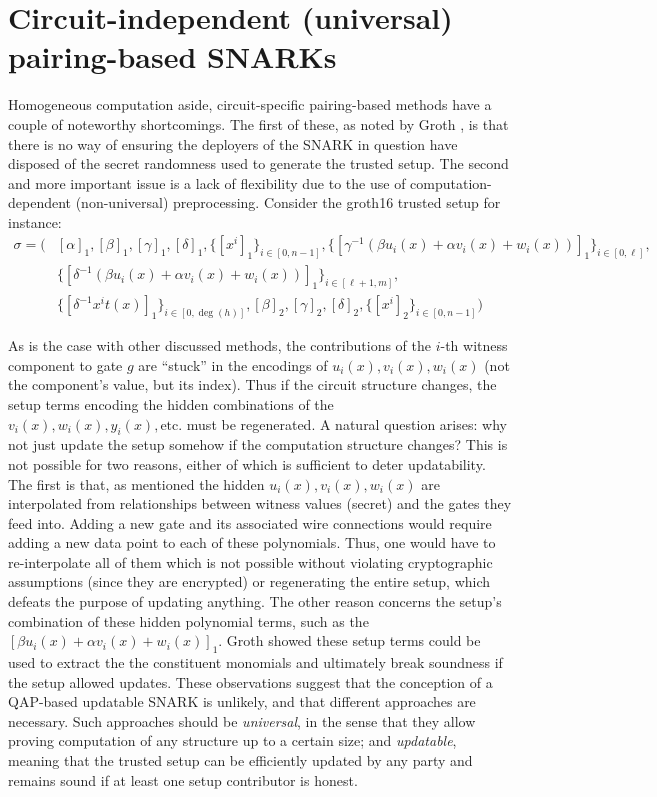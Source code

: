 \section{Circuit-independent (universal) pairing-based SNARKs}
\noindent Homogeneous computation aside, circuit-specific pairing-based methods have a couple of noteworthy shortcomings. The first of these, as noted by Groth \cite{grothupdatable}, is that there is no way of ensuring the deployers of the SNARK in question have disposed of the secret randomness used to generate the trusted setup. The second and more important issue is a lack of flexibility due to the use of computation-dependent (non-universal) preprocessing. Consider the groth16 trusted setup for instance: 
\begin{align}
\sigma = \Big( 
    &[\alpha]_1, [\beta]_1, [\gamma]_1, [\delta]_1, \{[x^i]_1\}_{i \in [0, n-1]}, \{[\gamma^{-1}(\beta u_i(x) + \alpha v_i(x) + w_i(x))]_1\}_{i \in [0, \ell]}, \\
    &\{[\delta^{-1}(\beta u_i(x) + \alpha v_i(x) + w_i(x))]_1\}_{i \in [\ell+1, m]}, \\
    &\{[\delta^{-1} x^i t(x)]_1\}_{i \in [0, \deg(h)]}, [\beta]_2, [\gamma]_2, [\delta]_2, \{[x^i]_2\}_{i \in [0, n-1]}
\Big)
\end{align}

\noindent As is the case with other discussed methods, the contributions of the $i$-th witness component to gate $g$ are ``stuck'' in the encodings of $u_i(x), v_i(x), w_i(x)$ (not the component's value, but its index). Thus if the circuit structure changes, the setup terms encoding the hidden combinations of the $v_i(x), w_i(x), y_i(x), \text{etc.}$ must be regenerated. A natural question arises: why not just update the setup somehow if the computation structure changes? This is not possible for two reasons, either of which is sufficient to deter updatability. The first is that, as mentioned the hidden $u_i(x), v_i(x), w_i(x)$ are interpolated from relationships between witness values (secret) and the gates they feed into. Adding a new gate and its associated wire connections would require adding a new data point to each of these polynomials. Thus, one would have to re-interpolate all of them which is not possible without violating cryptographic assumptions (since they are encrypted) or regenerating the entire setup, which defeats the purpose of updating anything. The other reason concerns the setup's combination of these hidden polynomial terms, such as the $[\beta u_i(x) + \alpha v_i(x) + w_i(x)]_1$. Groth \cite{grothupdatable} showed these setup terms could be used to extract the the constituent monomials and ultimately break soundness if the setup allowed updates. These observations suggest that the conception of a QAP-based updatable SNARK is unlikely, and that different approaches are necessary. Such approaches should be \textit{universal}, in the sense that they allow proving computation of any structure up to a certain size; and \textit{updatable}, meaning that the trusted setup can be efficiently updated by any party and remains sound if at least one setup contributor is honest.\\

